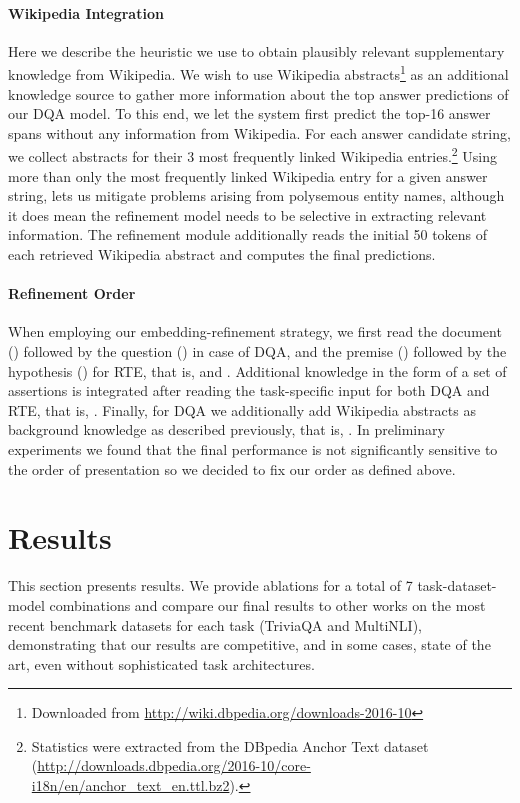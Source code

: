 \documentclass[11pt,a4paper]{article}
\begin{document}
\paragraph{Wikipedia Integration}
Here we describe the heuristic we use to obtain plausibly relevant supplementary knowledge from Wikipedia. We wish to use Wikipedia abstracts\footnote{Downloaded from \url{http://wiki.dbpedia.org/downloads-2016-10}} as an additional knowledge source to gather more information about the top answer predictions of our DQA model. To this end, we let the system first predict the top-16 answer spans without any information from Wikipedia. For each answer candidate string, we collect abstracts for their 3 most frequently linked Wikipedia entries.\footnote{Statistics were extracted from the DBpedia Anchor Text dataset (\url{http://downloads.dbpedia.org/2016-10/core-i18n/en/anchor_text_en.ttl.bz2}).} Using more than only the most frequently linked Wikipedia entry for a given answer string, lets us mitigate problems arising from polysemous entity names, although it does mean the refinement model needs to be selective in extracting relevant information. The refinement module additionally reads the initial 50 tokens of each retrieved Wikipedia abstract and computes the final predictions.

\paragraph{Refinement Order}
When employing our embedding-refinement strategy, we first read the document () followed by the question () in case of DQA, and the premise () followed by the hypothesis () for RTE, that is,  and . Additional knowledge in the form of a set of assertions  is integrated after reading the task-specific input for both DQA and RTE, that is, . Finally, for DQA we additionally add Wikipedia abstracts as background knowledge as described previously, that is, .
In preliminary experiments we found that the final performance is not significantly sensitive to the order of presentation so we decided to fix our order as defined above.

\section{Results}
\label{sec:results}

This section presents results. We provide ablations for a total of 7 task-dataset-model combinations and compare our final results to other works on the most recent benchmark datasets for each task (TriviaQA and MultiNLI), demonstrating that our results are competitive, and in some cases, state of the art, even without sophisticated task architectures.
\end{document}

